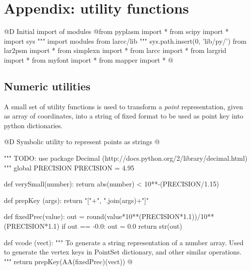 \documentclass[11pt,oneside]{article}	%
\begin{document}
\appendix
\section{Appendix: utility functions}
@D Initial import of modules
@{from pyplasm import *
from scipy import *
import sys
""" import modules from larcc/lib """
sys.path.insert(0, 'lib/py/')
from lar2psm import *
from simplexn import *
from larcc import *
from largrid import *
from myfont import *
from mapper import *
@}
\subsection{Numeric utilities}

A small set of utility functions is used to transform a \emph{point} representation, given as array of coordinates, into a string of fixed format to be used as point key into python dictionaries.

@D Symbolic utility to represent points as strings
@{""" TODO: use package Decimal (http://docs.python.org/2/library/decimal.html) """
global PRECISION
PRECISION = 4.95

def verySmall(number): return abs(number) < 10**-(PRECISION/1.15)

def prepKey (args): return "["+", ".join(args)+"]"

def fixedPrec(value):
	out = round(value*10**(PRECISION*1.1))/10**(PRECISION*1.1)
	if out == -0.0: out = 0.0
	return str(out)
	
def vcode (vect): 
	"""
	To generate a string representation of a number array.
	Used to generate the vertex keys in PointSet dictionary, and other similar operations.
	"""
	return prepKey(AA(fixedPrec)(vect))
@}




\end{document}
